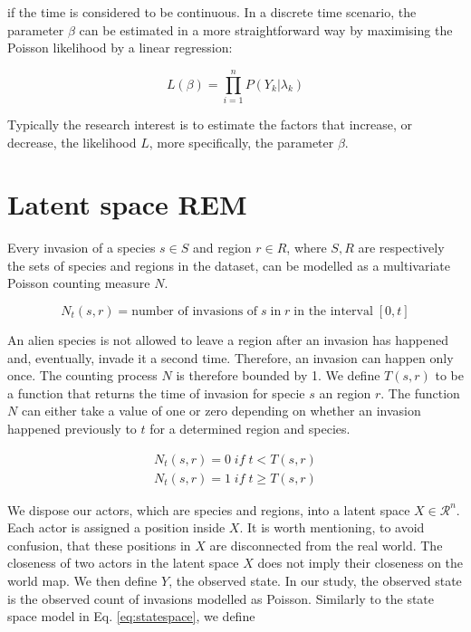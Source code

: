 \documentclass[mscthesis]{usiinfthesis}
\begin{document}
\noindent if the time is considered to be continuous. In a discrete time scenario, the parameter $\beta$ can be estimated in a more straightforward way by maximising the Poisson likelihood by a linear regression:

\[
L(\beta) =  \prod_{i=1}^n P(Y_k | \lambda_k)
\]


Typically the research interest is to estimate the factors that increase, or decrease, the likelihood $L$, more specifically, the parameter $\beta$.


\section{Latent space REM}
 

Every invasion of a species $s \in S$ and region $r \in R$, where $S, R$ are respectively the sets of species and regions in the dataset, can be modelled as a multivariate Poisson counting measure  $N$.

\[
N_t(s, r) = \textrm{number of invasions of} \; s \; \textrm{in} \; r \; \textrm{in the interval} \; [0, t]
\]

An alien species is not allowed to leave a region after an invasion has happened and, eventually, invade it a second time. Therefore, an invasion can happen only once. The counting process $N$ is therefore bounded by 1. We define $T(s, r)$ to be a function that returns the time of invasion for specie $s$ an region $r$. The function $N$ can either take a value of one or zero depending on whether an invasion happened previously to $t$ for a determined region and species.


\begin{eqfloat}
\begin{equation}
\begin{array}{l}
N_t(s, r) = 0 \; if \; t < T(s, r) \\
N_t(s, r) = 1 \; if \; t \geq T(s, r)
\end{array}
\label{eq:counting process}
\end{equation}
\end{eqfloat}


We dispose our actors, which are species and regions, into a latent space $X \in \mathcal{R}^n$. Each actor is assigned a position inside $X$. It is worth mentioning, to avoid confusion, that these positions in $X$ are disconnected from the real world. The closeness of two actors in the latent space $X$ does not imply their closeness on the world map. We then define $Y$, the observed state. In our study, the observed state is the observed count of invasions modelled as Poisson. Similarly to the state space model in Eq. \ref{eq:statespace}, we define
\end{document}
